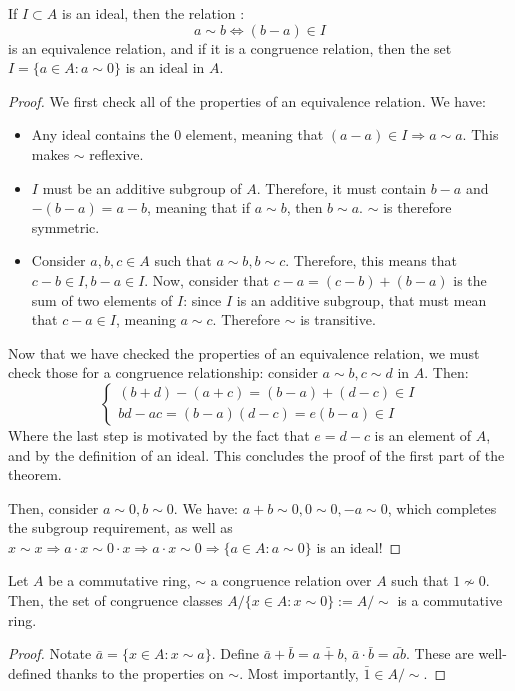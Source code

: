 \begin{theorem*}
  If $I \subset A$ is an ideal, then the relation : 
  \[
    a \sim b \Leftrightarrow (b - a) \in I
  \]
  is an equivalence relation, and if it is a congruence relation, then the set $I = \{a \in A: a \sim 0\}$ is an ideal in $A$. 
\end{theorem*}
\begin{proof}
  We first check all of the properties of an equivalence relation. We have: 
  \begin{itemize}
    \item Any ideal contains the 0 element, meaning that $(a - a) \in I \Rightarrow a \sim a$. This makes $\sim$ reflexive. 
    \item $I$ must be an additive subgroup of $A$. Therefore, it must contain $b - a$ and $-(b - a) = a - b$, meaning that if $a \sim b$, then $b \sim a$. $\sim$ is therefore symmetric. 
    \item Consider $a, b, c \in A$ such that $a \sim b, b \sim c$. Therefore, this means that $c - b \in I, b - a \in I$. Now, consider that $c - a = (c - b) + (b - a)$ is the sum of two elements of $I$: since $I$ is an additive subgroup, that must mean that $c - a \in I$, meaning $a \sim c$. Therefore $\sim$ is transitive. 
  \end{itemize}
  Now that we have checked the properties of an equivalence relation, we must check those for a congruence relationship: consider $a \sim b, c \sim d$ in $A$. Then: 
  \[
    \begin{cases}
      (b + d) - (a + c) = (b - a) + (d - c) \in I \\
      bd - ac = (b - a)(d - c) = e(b - a) \in I
    \end{cases}
  \]
  Where the last step is motivated by the fact that $e = d - c$ is an element of $A$, and by the definition of an ideal. This concludes the proof of the first part of the theorem. 
  
  Then, consider $a \sim 0, b \sim 0$. We have: $a + b \sim 0, 0 \sim 0, -a \sim 0$, which completes the subgroup requirement, as well as $x \sim x \Rightarrow a \cdot x \sim 0 \cdot x \Rightarrow a \cdot x \sim 0 \Rightarrow \{a \in A: a \sim 0\}$ is an ideal! 
\end{proof}

\begin{theorem*}
  Let $A$ be a commutative ring, $\sim$ a congruence relation over $A$ such that $1 \not\sim 0$. Then, the set of congruence classes $A/\{x \in A : x \sim 0\} := A/{\sim}$ is a commutative ring. 
\end{theorem*}
\begin{proof}
  Notate $\bar{a} = \{x \in A: x \sim a\}$. Define $\bar{a} + \bar{b} = \bar{a + b}$, $\bar{a} \cdot \bar{b} = \bar{ab}$. These are well-defined thanks to the properties on $\sim$. Most importantly, $\bar{1} \in A/{\sim}$. 
\end{proof}

